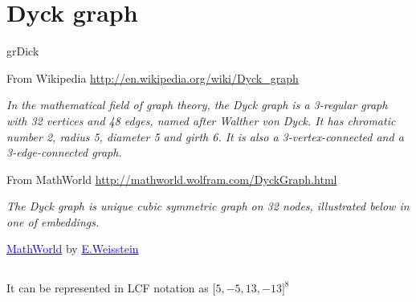 \newpage\section{Dyck graph}\label{dyck}
\begin{NewMacroBox}{grDick}{} 
  
From Wikipedia \url{http://en.wikipedia.org/wiki/Dyck_graph}

\emph{In the mathematical field of graph theory, the Dyck graph is a 3-regular graph with 32 vertices and 48 edges, named after Walther von Dyck. It has chromatic number 2,  radius 5, diameter 5 and girth 6. It is also a 3-vertex-connected and a 3-edge-connected graph.
}

\medskip
From MathWorld \url{http://mathworld.wolfram.com/DyckGraph.html}

\emph{The Dyck graph is unique cubic symmetric graph on 32 nodes, illustrated below in one of embeddings.}       

\href{http://mathworld.wolfram.com/topics/GraphTheory.html}%
           {\textcolor{blue}{MathWorld}} by \href{http://en.wikipedia.org/wiki/Eric_W._Weisstein}%
           {\textcolor{blue}{E.Weisstein}}   
\end{NewMacroBox} 

\subsection{}

It can be represented in LCF notation as  $\big[5,-5,13,-13\big]^8$



\subsection{}
\begin{center}
\begin{tkzexample}[vbox]
\end{tkzexample} 
\end{center}


\vfill\endinput